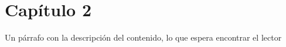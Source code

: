 \chapter{Capítulo 2}

Un párrafo con la descripción del contenido, lo que espera encontrar el lector